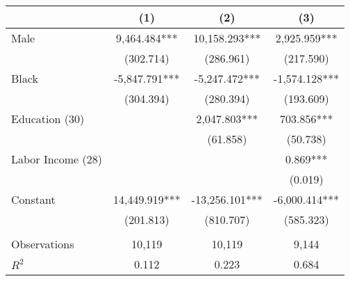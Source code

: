 \begin{tabular}{lccc} \toprule
 & (1) & (2) & (3) \\ \midrule
Male & 9,464.484*** & 10,158.293*** & 2,925.959*** \\
 & (302.714) & (286.961) & (217.590) \\
Black & -5,847.791*** & -5,247.472*** & -1,574.128*** \\
 & (304.394) & (280.394) & (193.609) \\
Education (30) &  & 2,047.803*** & 703.856*** \\
 &  & (61.858) & (50.738) \\
Labor Income (28) &  &  & 0.869*** \\
 &  &  & (0.019) \\
Constant & 14,449.919*** & -13,256.101*** & -6,000.414*** \\
 & (201.813) & (810.707) & (585.323) \\
 &  &  &  \\
Observations & 10,119 & 10,119 & 9,144 \\
$R^2$ & 0.112 & 0.223 & 0.684 \\ \bottomrule
\end{tabular}
